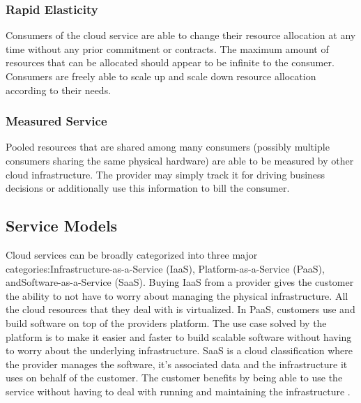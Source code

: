 \documentclass[12pt]{article}
\begin{document}
\subsubsection{Rapid Elasticity} \label{ssub:elasticity}

Consumers of the cloud service are able to change their resource allocation at any time without any prior commitment or contracts. The maximum amount of resources that can be allocated should appear to be infinite to the consumer. Consumers are freely able to scale up and scale down resource allocation according to their needs.


\subsubsection{Measured Service} \label{ssub:measured-service}

Pooled resources that are shared among many consumers (possibly multiple consumers sharing the same physical hardware) are able to be measured by other cloud infrastructure. The provider may simply track it for driving business decisions or additionally use this information to bill the consumer.



\subsection{Service Models} \label{sub:servicemodels}

Cloud services can be broadly categorized into three major categories:\linebreak Infrastructure-as-a-Service (IaaS), Platform-as-a-Service (PaaS), and\linebreak Software-as-a-Service (SaaS). Buying IaaS from a provider gives the customer the ability to not have to worry about managing the physical infrastructure. All the cloud resources that they deal with is virtualized. In PaaS, customers use and build software on top of the providers platform. The use case solved by the platform is to make it easier and faster to build scalable software without having to worry about the underlying infrastructure. SaaS is a cloud classification where the provider manages the software, it's associated data and the infrastructure it uses on behalf of the customer. The customer benefits by being able to use the service without having to deal with running and maintaining the infrastructure \cite{Manvi2014}.
\end{document}
